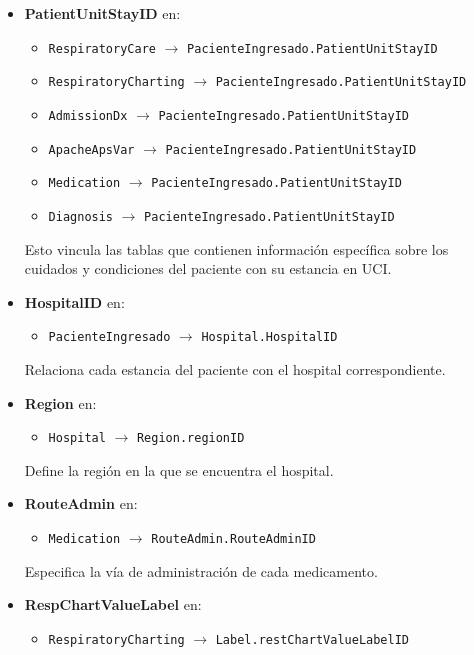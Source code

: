 \documentclass[12pt, a4paper, twoside]{article}
\begin{document}
	\begin{itemize}
		\item \textbf{PatientUnitStayID} en:
		\begin{itemize}
			\item \texttt{RespiratoryCare} $\rightarrow$ \texttt{PacienteIngresado.PatientUnitStayID}
			\item \texttt{RespiratoryCharting} $\rightarrow$ \texttt{PacienteIngresado.PatientUnitStayID}
			\item \texttt{AdmissionDx} $\rightarrow$ \texttt{PacienteIngresado.PatientUnitStayID}
			\item \texttt{ApacheApsVar} $\rightarrow$ \texttt{PacienteIngresado.PatientUnitStayID}
			\item \texttt{Medication} $\rightarrow$ \texttt{PacienteIngresado.PatientUnitStayID}
			\item \texttt{Diagnosis} $\rightarrow$ \texttt{PacienteIngresado.PatientUnitStayID}
		\end{itemize}
		
		Esto vincula las tablas que contienen información específica sobre los cuidados y condiciones del paciente con su estancia en UCI.
		
		\item \textbf{HospitalID} en:
		\begin{itemize}
			\item \texttt{PacienteIngresado} $\rightarrow$ \texttt{Hospital.HospitalID}
		\end{itemize}
		
		Relaciona cada estancia del paciente con el hospital correspondiente.
		
		\item \textbf{Region} en:
		\begin{itemize}
			\item \texttt{Hospital} $\rightarrow$ \texttt{Region.regionID}
		\end{itemize}
		
		Define la región en la que se encuentra el hospital.
		
		
		\item \textbf{RouteAdmin} en:
		\begin{itemize}
			\item \texttt{Medication} $\rightarrow$ \texttt{RouteAdmin.RouteAdminID}
		\end{itemize}
		
		Especifica la vía de administración de cada medicamento.
		
		\item \textbf{RespChartValueLabel} en:
		\begin{itemize}
			\item \texttt{RespiratoryCharting} $\rightarrow$ \texttt{Label.restChartValueLabelID}
		\end{itemize}
		

\end{itemize}
\end{document}
